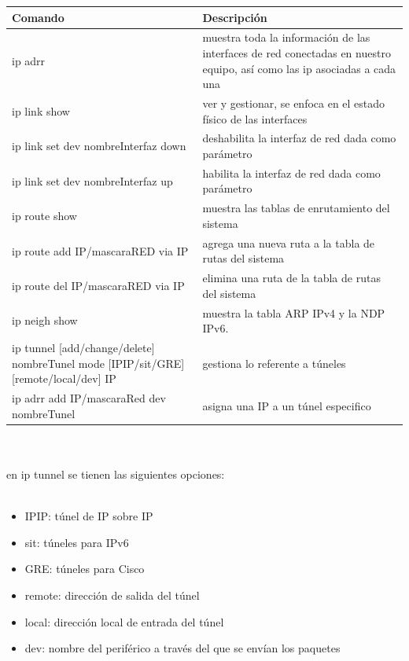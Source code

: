 \documentclass[10pt,a4paper,titlepage]{article}
\begin{document}
	\begin{tabular}{|p{8cm}|p{7cm}|}
		\hline
		Comando & Descripción \\
		\hline
		ip adrr & muestra toda la información de las interfaces de red conectadas en nuestro equipo, así como las ip asociadas a cada una \\
		\hline
		ip link show & ver y gestionar, se enfoca en el estado físico de las interfaces \\
		\hline
		ip link set dev nombreInterfaz down & deshabilita la interfaz de red dada como parámetro \\
		\hline
		ip link set dev nombreInterfaz up & habilita la interfaz de red dada como parámetro \\
		\hline
		ip route show & muestra las tablas de enrutamiento del sistema \\
		\hline
		ip route add IP/mascaraRED via IP & agrega una nueva ruta a la tabla de rutas del sistema \\
		\hline
		ip route del IP/mascaraRED via IP & elimina una ruta de la tabla de rutas del sistema \\
		\hline
		ip neigh show & muestra la tabla ARP IPv4 y la NDP IPv6. \\
		\hline
		ip tunnel [add/change/delete] nombreTunel mode [IPIP/sit/GRE] [remote/local/dev] IP & gestiona lo referente a túneles \\ 
		\hline
		ip adrr add IP/mascaraRed dev nombreTunel & asigna una IP a un túnel especifico \\
		\hline
	\end{tabular}
	\\
	\\
	en ip tunnel se tienen las siguientes opciones:
	\\
	\\
	\begin{itemize}
		\item IPIP: túnel de IP sobre IP
		\item sit: túneles para IPv6
		\item GRE: túneles para Cisco
	\end{itemize}

	\begin{itemize}
		\item remote: dirección de salida del túnel
		\item local: dirección local de entrada del túnel
		\item dev: nombre del periférico a través del que se envían los paquetes
	\end{itemize}
	
\end{document}
